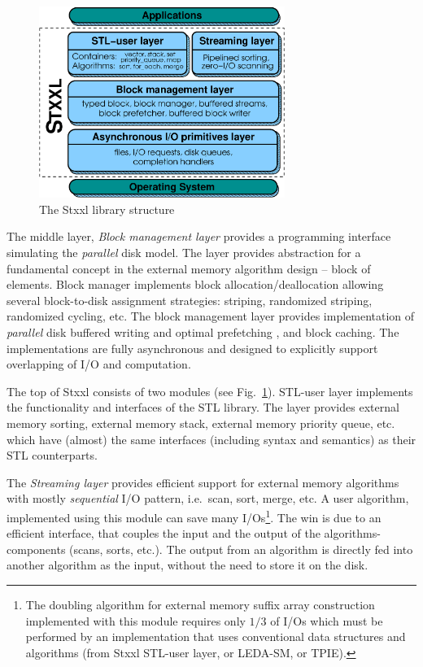 \documentclass[twoside]{book}
\newcommand{\stxxl}{{\sc Stxxl} }
\begin{document}
\begin{figure}[hb]
\begin{center}
\includegraphics[width=8cm]{logo1}
\end{center}
\vspace*{-0.3cm}
\caption{\label{stxxlstructure}The \stxxl library structure}
\end{figure}

The middle layer, \emph{Block management layer} provides a programming
interface simulating the \emph{parallel} disk model. The layer provides
abstraction for a fundamental concept in the external memory algorithm
design -- block of elements. Block manager implements
block allocation/deallocation allowing several block-to-disk
assignment strategies: striping, randomized striping, randomized
cycling, etc. The block management layer provides implementation
of \emph{parallel} disk buffered writing and optimal prefetching
\cite{HutSanVit01b}, and block caching. The implementations are fully
asynchronous and designed to explicitly support overlapping of I/O
and computation. 

The top of \stxxl consists of two modules (see Fig.~\ref{stxxlstructure}). 
STL-user layer implements the functionality and interfaces of the STL
library. The layer provides external memory sorting, external memory
stack, external memory priority queue, etc. which have
(almost) the same interfaces (including syntax and semantics) as their
STL counterparts.

The \emph{Streaming layer} provides efficient support for external
memory algorithms with mostly \emph{sequential} I/O pattern, i.e.\ scan, sort,
merge, etc. A user algorithm, implemented using this module can save
many I/Os\footnote{The doubling algorithm for external memory suffix
array construction implemented with this module requires only $1/3$ of
I/Os which must be performed by an implementation that uses conventional
data structures and algorithms (from \stxxl STL-user layer, or LEDA-SM,
or TPIE).}. The win is due to an efficient interface, that couples the
input   
and the output of the algorithms-components (scans, sorts,
etc.). The 
output from an algorithm is directly fed into another algorithm as the
input, without the need to store it on the disk.
\end{document}
